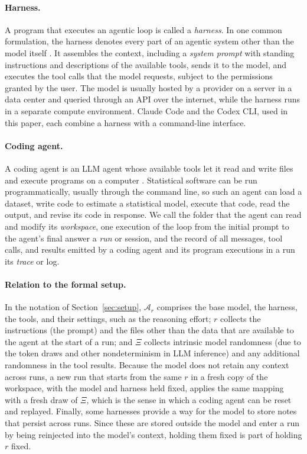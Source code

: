 \documentclass[10pt]{article}
\begin{document}
\paragraph{Harness.} A program that executes an agentic loop is called a \emph{harness}. In one common formulation, the harness denotes every part of an agentic system other than the model itself \citep{trivedy2026harness}. It assembles the context, including a \emph{system prompt} with standing instructions and descriptions of the available tools, sends it to the model, and executes the tool calls that the model requests, subject to the permissions granted by the user. The model is usually hosted by a provider on a server in a data center and queried through an API over the internet, while the harness runs in a separate compute environment. Claude Code \citep{anthropic2025claudecode} and the Codex CLI, used in this paper, each combine a harness with a command-line interface.

\paragraph{Coding agent.} A coding agent is an LLM agent whose available tools let it read and write files and execute programs on a computer \citep{lucas2023openinterpreter, yang2024sweagent}. Statistical software can be run programmatically, usually through the command line, so such an agent can load a dataset, write code to estimate a statistical model, execute that code, read the output, and revise its code in response. We call the folder that the agent can read and modify its \emph{workspace}, one execution of the loop from the initial prompt to the agent's final answer a \emph{run} or session, and the record of all messages, tool calls, and results emitted by a coding agent and its program executions in a run its \emph{trace} or log.

\paragraph{Relation to the formal setup.} In the notation of Section~\ref{sec:setup}, $\mathcal A_r$ comprises the base model, the harness, the tools, and their settings, such as the reasoning effort; $r$ collects the instructions (the prompt) and the files other than the data that are available to the agent at the start of a run; and $\Xi$ collects intrinsic model randomness (due to the token draws and other nondeterminism in LLM inference) and any additional randomness in the tool results. Because the model does not retain any context across runs, a new run that starts from the same $r$ in a fresh copy of the workspace, with the model and harness held fixed, applies the same mapping with a fresh draw of $\Xi$, which is the sense in which a coding agent can be reset and replayed. Finally, some harnesses provide a way for the model to store notes that persist across runs. Since these are stored outside the model and enter a run by being reinjected into the model's context, holding them fixed is part of holding $r$ fixed.
\end{document}
